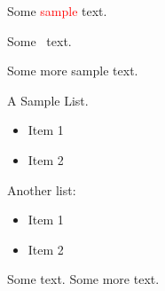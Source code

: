 \documentclass{article}
\providecommand{\TeXParserLibToImage}[2][]{#2}
\begin{document}
Some \textcolor{red}{sample} text.

\TeXParserLibToImage[type={image/png}]{Some \sample\ text.}

Some more sample text.

\TeXParserLibToImage[type={image/png}]{A Sample List.
\begin{itemize}
 \item Item 1
 \item Item 2
\end{itemize}}

Another list:
\begin{itemize}
 \item Item 1
 \item Item 2
\end{itemize}

\lipsum[1]

Some text.  Some more text.
\end{document}
